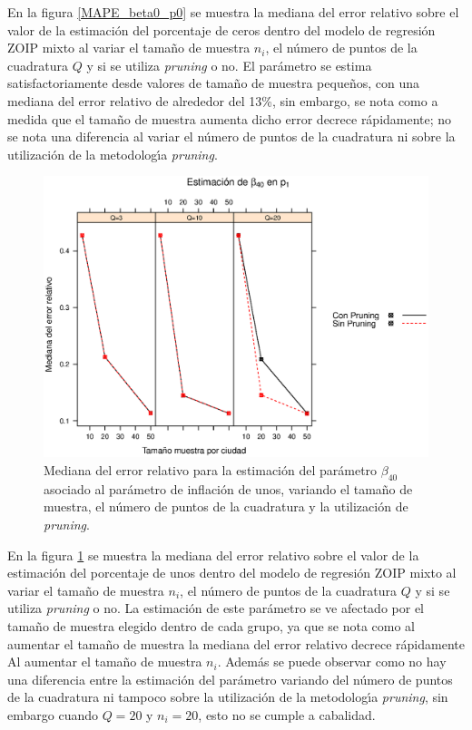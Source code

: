 En la figura \ref{MAPE_beta0_p0} se muestra la mediana del error relativo sobre el valor de la estimaci\'{o}n del porcentaje de ceros dentro del modelo de regresi\'{o}n ZOIP mixto al variar el tama\~{n}o de muestra $n_i$, el n\'{u}mero de puntos de la cuadratura $Q$ y si se utiliza \textit{pruning} o no. El par\'{a}metro se estima satisfactoriamente desde valores de tama\~{n}o de muestra peque\~{n}os, con una mediana del error relativo de alrededor del 13\%, sin embargo, se nota como a medida que el tama\~{n}o de muestra aumenta dicho error decrece r\'{a}pidamente; no se nota una diferencia al variar el n\'{u}mero de puntos de la cuadratura ni sobre la utilizaci\'{o}n de la metodolog\'{\i}a \textit{pruning}.\\

\begin{figure}
	\begin{center}
		\includegraphics[scale=0.6]{MAPE_beta0_p1.eps}	
		\caption{Mediana del error relativo para la estimaci\'{o}n del par\'{a}metro $\beta_{40}$ asociado al par\'{a}metro de inflaci\'{o}n de unos, variando el tama\~{n}o de muestra, el n\'{u}mero de puntos de la cuadratura y la utilizaci\'{o}n de \textit{pruning}.}
		\label{MAPE_beta0_p1}
	\end{center}
\end{figure}

En la figura \ref{MAPE_beta0_p1} se muestra la mediana del error relativo sobre el valor de la estimaci\'{o}n del porcentaje de unos dentro del modelo de regresi\'{o}n ZOIP mixto al variar el tama\~{n}o de muestra $n_i$, el n\'{u}mero de puntos de la cuadratura $Q$ y si se utiliza \textit{pruning} o no. La estimaci\'{o}n de este par\'{a}metro se ve afectado por el tama\~{n}o de muestra elegido dentro de cada grupo, ya que se nota como al aumentar el tama\~{n}o de muestra la mediana del error relativo decrece r\'{a}pidamente Al aumentar el tama\~{n}o de muestra $n_i$. Adem\'{a}s se puede observar como no hay una diferencia entre la estimaci\'{o}n del par\'{a}metro variando del n\'{u}mero de puntos de la cuadratura ni tampoco sobre la utilizaci\'{o}n de la metodolog\'{\i}a \textit{pruning}, sin embargo cuando $Q=20$ y $n_i=20$, esto no se cumple a cabalidad.\\

